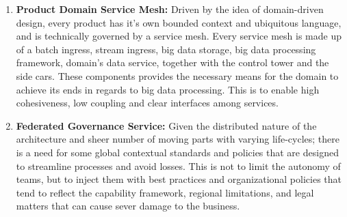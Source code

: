 \documentclass[runningheads]{llncs}
\begin{document}
\begin{enumerate}
    \item \textbf{Product Domain Service Mesh:} Driven by the idea of domain-driven design, every product has it's own bounded context and ubiquitous language, and is technically governed by a service mesh. Every service mesh is made up of a batch ingress, stream ingress, big data storage, big data processing framework, domain's data service, together with the control tower and the side cars. These components provides the necessary means for the domain to achieve its ends in regards to big data processing. This is to enable high cohesiveness, low coupling and clear interfaces among services. 
    \item \textbf{Federated Governance Service:} Given the distributed nature of the architecture and sheer number of moving parts with varying life-cycles; there is a need for some global contextual standards and policies that are designed to streamline processes and avoid losses. This is not to limit the autonomy of teams, but to inject them with best practices and organizational policies that tend to reflect the capability framework, regional limitations, and legal matters that can cause sever damage to the business. 
    

\end{enumerate}
\end{document}
